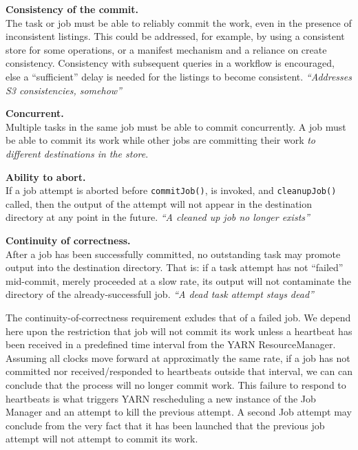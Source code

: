 \documentclass[conference]{IEEEtran}
\begin{document}
\begin{paragraph}
  \textbf{Consistency of the commit.}\\
  The task or job must be able to reliably commit the work, even in the presence
  of inconsistent listings.
  This could be addressed, for example, by using a consistent store for some operations,
  or a manifest mechanism and a reliance on create consistency.
  Consistency with subsequent queries in a workflow is encouraged, else a ``sufficient''
  delay is needed for the listings to become consistent.
  \emph{``Addresses S3 consistencies, somehow''}
\end{paragraph}

\begin{paragraph}
  \textbf{Concurrent.}\\
  Multiple tasks in the same job must be able to commit concurrently.
  A job must be able to commit its work while other jobs are committing
  their work \emph{to different destinations in the store}.
\end{paragraph}

\begin{paragraph}
  \textbf{Ability to abort.}\\
  If a job attempt is aborted before \texttt{commitJob()}, is invoked, and
  \texttt{cleanupJob()} called, then the output of the attempt will not appear in the
  destination directory at any point in the future.
  \emph{``A cleaned up job no longer exists''}
\end{paragraph}


\begin{paragraph}
  \textbf{Continuity of correctness.}\\
  After a job has been successfully committed, no outstanding task may promote
  output into the destination directory.
  That is: if a task attempt has not ``failed'' mid-commit, merely proceeded at a slow rate,
  its output will not contaminate the directory of the already-successfull job.
  \emph{``A dead task attempt stays dead''}
\end{paragraph}


The continuity-of-correctness requirement exludes that of a failed job.
We depend here upon the restriction that job will not commit its work unless
a heartbeat has been received in a predefined time interval from the YARN ResourceManager.
Assuming all clocks move forward at approximatly the same rate, if a job has
not committed nor received/responded to heartbeats outside that interval,
we can can conclude that the process will no longer commit work.
This failure to respond to heartbeats is what triggers YARN rescheduling a new
instance of the Job Manager and an attempt to kill the previous attempt.
A second Job attempt may conclude from the very fact that it has been launched
that the previous job attempt will not attempt to commit its work.
\end{document}
